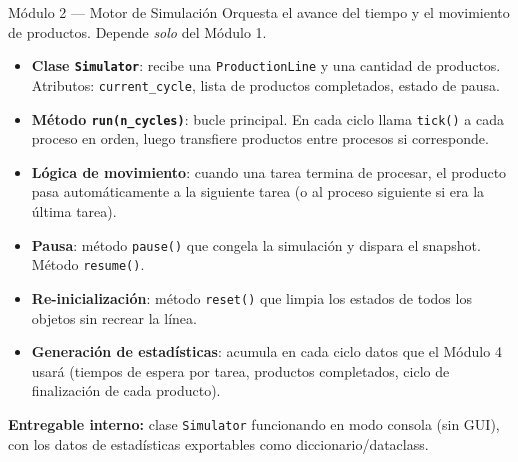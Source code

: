 \documentclass[12pt,letterpaper]{article}
\begin{document}
\begin{modbox}[mod2]{Módulo 2 --- Motor de Simulación}
Orquesta el avance del tiempo y el movimiento de productos. Depende \emph{solo} del Módulo 1.

\begin{itemize}[leftmargin=1.5em, itemsep=2pt]
    \item \textbf{Clase \texttt{Simulator}}: recibe una \texttt{ProductionLine} y una cantidad de productos. Atributos: \texttt{current\_cycle}, lista de productos completados, estado de pausa.
    \item \textbf{Método \texttt{run(n\_cycles)}}: bucle principal. En cada ciclo llama \texttt{tick()} a cada proceso en orden, luego transfiere productos entre procesos si corresponde.
    \item \textbf{Lógica de movimiento}: cuando una tarea termina de procesar, el producto pasa automáticamente a la siguiente tarea (o al proceso siguiente si era la última tarea).
    \item \textbf{Pausa}: método \texttt{pause()} que congela la simulación y dispara el snapshot. Método \texttt{resume()}.
    \item \textbf{Re-inicialización}: método \texttt{reset()} que limpia los estados de todos los objetos sin recrear la línea.
    \item \textbf{Generación de estadísticas}: acumula en cada ciclo datos que el Módulo 4 usará (tiempos de espera por tarea, productos completados, ciclo de finalización de cada producto).
\end{itemize}

\textbf{Entregable interno:} clase \texttt{Simulator} funcionando en modo consola (sin GUI), con los datos de estadísticas exportables como diccionario/dataclass.
\end{modbox}

\vspace{0.7em}
\end{document}
